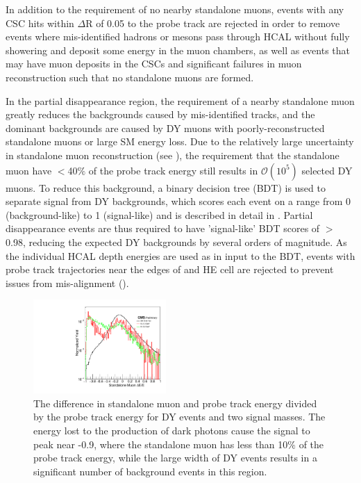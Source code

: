 In addition to the requirement of no nearby standalone muons, events with any CSC hits within $\Delta$R of 0.05 to the probe track are rejected in order to remove events where mis-identified hadrons or mesons pass through HCAL without fully showering and deposit some energy in the muon chambers, as well as events that may have muon deposits in the CSCs and significant failures in muon reconstruction such that no standalone muons are formed.

In the partial disappearance region, the requirement of a nearby standalone muon greatly reduces the backgrounds caused by mis-identified tracks, and the dominant backgrounds are caused by DY muons with poorly-reconstructed standalone muons or large SM energy loss.
Due to the relatively large uncertainty in standalone muon reconstruction (see ), the requirement that the standalone muon have $<$40$\%$ of the probe track energy still results in $\mathcal{O}(10^{5})$ selected DY muons.
To reduce this background, a binary decision tree (BDT) is used to separate signal from DY backgrounds, which scores each event on a range from 0 (background-like) to 1 (signal-like) and is described in detail in .
Partial disappearance events are thus required to have 'signal-like' BDT scores of $>$0.98, reducing the expected DY backgrounds by several orders of magnitude.
As the individual HCAL depth energies are used as in input to the BDT, events with probe track trajectories near the edges of and HE cell are rejected to prevent issues from mis-alignment ().

\begin{figure}[htpb]
	\centering
	\includegraphics[width=0.45\textwidth]{figures/allEventsStandaloneMuondEoverE_stack.pdf}
	\caption[Standalone Muon Energy Differences]{The difference in standalone muon and probe track energy divided by the probe track energy for DY events and two signal masses. The energy lost to the production of dark photons cause the signal to peak near -0.9, where the standalone muon has less than 10$\%$ of the probe track energy, while the large width of DY events results in a significant number of background events in this region.}
	\label{fig:staDEoverE}
\end{figure}

